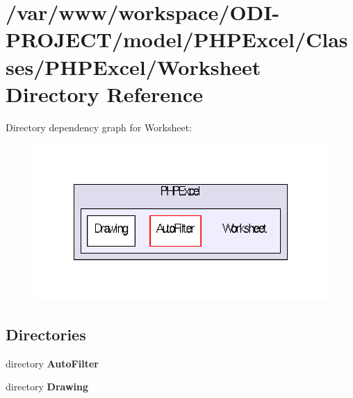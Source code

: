 \section{/var/www/workspace/\+O\+D\+I-\/\+P\+R\+O\+J\+E\+C\+T/model/\+P\+H\+P\+Excel/\+Classes/\+P\+H\+P\+Excel/\+Worksheet Directory Reference}
\label{dir_f62f5afd22b84c693377ab9237619119}
Directory dependency graph for Worksheet\+:\nopagebreak
\begin{figure}[H]
\begin{center}
\leavevmode
\includegraphics[width=348pt]{dir_f62f5afd22b84c693377ab9237619119_dep}
\end{center}
\end{figure}
\subsection*{Directories}
\begin{DoxyCompactItemize}
\item 
directory {\bf Auto\+Filter}
\item 
directory {\bf Drawing}
\end{DoxyCompactItemize}
